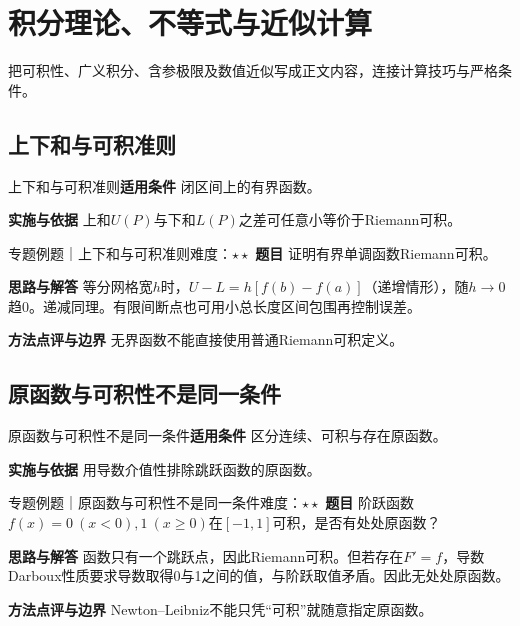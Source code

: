 \section{积分理论、不等式与近似计算}\label{mat:integral_analysis}
\begin{examtip}把可积性、广义积分、含参极限及数值近似写成正文内容，连接计算技巧与严格条件。\end{examtip}
\subsection{上下和与可积准则}\label{mat:integral_analysis:riemann}
\begin{method}{上下和与可积准则}\textbf{适用条件} 闭区间上的有界函数。\par\textbf{实施与依据} 上和$U(P)$与下和$L(P)$之差可任意小等价于Riemann可积。\end{method}
\begin{example}{专题例题｜上下和与可积准则}{难度：$\star\star$}
\textbf{题目} 证明有界单调函数Riemann可积。\par\textbf{思路与解答} 等分网格宽$h$时，$U-L=h[f(b)-f(a)]$（递增情形），随$h\to0$趋0。递减同理。有限间断点也可用小总长度区间包围再控制误差。\par\textbf{方法点评与边界} 无界函数不能直接使用普通Riemann可积定义。
\end{example}
\subsection{原函数与可积性不是同一条件}\label{mat:integral_analysis:primitive}
\begin{method}{原函数与可积性不是同一条件}\textbf{适用条件} 区分连续、可积与存在原函数。\par\textbf{实施与依据} 用导数介值性排除跳跃函数的原函数。\end{method}
\begin{example}{专题例题｜原函数与可积性不是同一条件}{难度：$\star\star$}
\textbf{题目} 阶跃函数$f(x)=0\ (x<0),1\ (x\ge0)$在$[-1,1]$可积，是否有处处原函数？\par\textbf{思路与解答} 函数只有一个跳跃点，因此Riemann可积。但若存在$F\prime=f$，导数Darboux性质要求导数取得0与1之间的值，与阶跃取值矛盾。因此无处处原函数。\par\textbf{方法点评与边界} Newton--Leibniz不能只凭“可积”就随意指定原函数。
\end{example}
